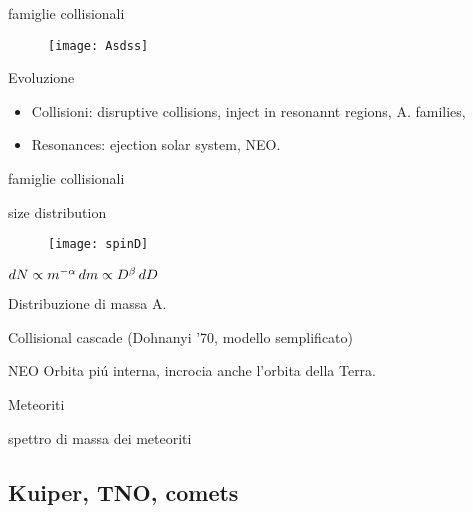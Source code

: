 \begin{frame}{famiglie collisionali}
\begin{figure}[!ht]
\texttt{[image: Asdss]}
\end{figure}
\begin{block}{Evoluzione}
\begin{itemize}
\item Collisioni: disruptive collisions, inject in resonannt regions, A. families,
\item Resonances: ejection solar system, NEO.
\end{itemize}
\end{block}
\end{frame}

\begin{wordonframe}{famiglie collisionali}

\end{wordonframe}

\begin{frame}{size distribution}
\begin{figure}[!ht]\texttt{[image: spinD]}
\end{figure}
$dN\propto m^{-\alpha}\,dm\propto D^{\beta}\,dD$
\end{frame}

\begin{wordonframe}{Distribuzione di massa A.}
\begin{block}{Collisional cascade (Dohnanyi '70, modello semplificato)}

\end{block}
\end{wordonframe}

\begin{frame}{NEO}
Orbita pi\'u interna, incrocia anche l'orbita della Terra.
\end{frame}

\begin{frame}{Meteoriti}

\end{frame}

\begin{wordonframe}{spettro di massa dei meteoriti}

\end{wordonframe}

\subsection{Kuiper, TNO, comets}

